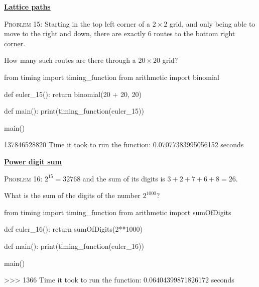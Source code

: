 \documentclass[11pt]{article}
\begin{document}
\par\bigskip\noindent
\href{https://projecteuler.net/problem=5}{\textbf{Lattice paths}}
\par\noindent
\textsc{Problem 15:}
Starting in the top left corner of a $2\times 2$ grid, and only being able to move to the right and down, there are exactly 6 routes to the bottom right corner.
\par
How many such routes are there through a $20\times 20$ grid?
\begin{code}
from timing import timing_function
from arithmetic import binomial

def euler_15():
    return binomial(20 + 20, 20)

def main():
    print(timing_function(euler_15))

main()
\end{code}
\begin{shell}
137846528820
Time it took to run the function: 0.07077383995056152 seconds
\end{shell}
\par\bigskip\noindent
\href{https://projecteuler.net/problem=16}{\textbf{Power digit sum}}\par\noindent
\textsc{Problem 16:}
$2^{15} = 32768$ and the sum of its digits is $3 + 2 + 7 + 6 + 8 = 26$.
\par
What is the sum of the digits of the number $2^{1000}$?
\begin{code}
from timing import timing_function
from arithmetic import sumOfDigits

def euler_16():
    return sumOfDigits(2**1000)

def main():
    print(timing_function(euler_16))

main()
\end{code}
\begin{shell}
>>> 
1366
Time it took to run the function: 0.06404399871826172 seconds
\end{shell}
\end{document}

